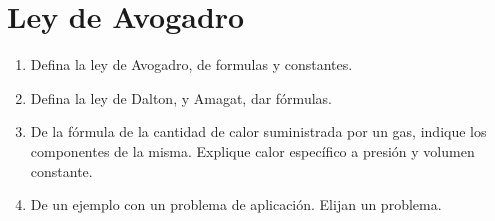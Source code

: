 \documentclass[../main]{subfiles}
\begin{document}
\chapter{Ley de Avogadro}
\begin{enumerate}
\item Defina la ley de Avogadro, de formulas y constantes.
\item Defina la ley de Dalton, y Amagat, dar fórmulas.
\item De la fórmula de la cantidad de calor suministrada por un gas,
  indique los componentes de la misma. Explique calor específico a
  presión y volumen constante.
\item De un ejemplo con un problema de aplicación. Elijan un problema.
\end{enumerate}
\end{document}
